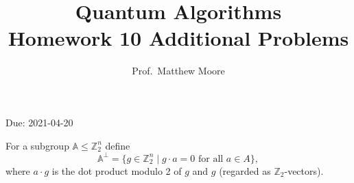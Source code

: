 \documentclass[oneside]{amsart}  %
\newcommand{\ZZ}{\mathbb{Z}}
\newcommand{\m}[1]{\mathbb{#1}}      %
\newcommand{\alg}[1]{\m{#1}}         %
\theoremstyle{plain}
\theoremstyle{definition}
\theoremstyle{remark}
\numberwithin{equation}{section}  %
\newif\ifsolutions
\begin{document}
\title[Quantum Algorithms, HW 10 Additional Problems]
  {Quantum Algorithms \\ Homework 10 Additional Problems}
\author{Prof.~Matthew Moore}
\maketitle

\vspace{-0.7em} \begin{center}
  \sc Due: 2021-04-20
\end{center}

\vspace{2em}

\noindent
For a subgroup $\alg{A}\leq \ZZ_2^n$ define
\[
  \alg{A}^{\perp}
  = \big\{ g\in \ZZ_2^n \mid g\cdot a = 0 \text{ for all } a\in A \big\},
\]
where $a\cdot g$ is the dot product modulo 2 of $g$ and $g$ (regarded as
$\ZZ_2$-vectors).

\bigskip
\end{document}
